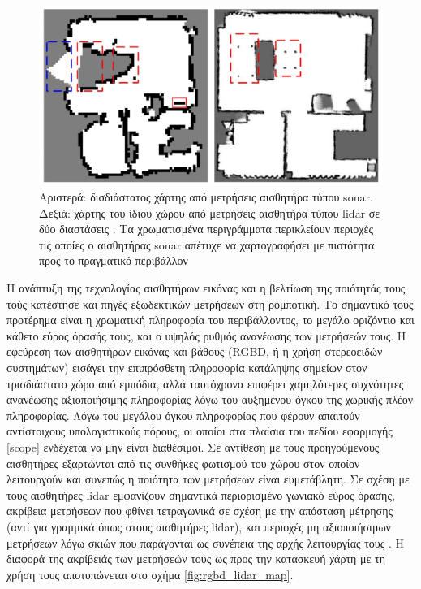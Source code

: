 \begin{figure}\centering
  \includegraphics[scale=0.5]{./figures/parts/01/chapters/01/sections/01/sonar_lidar_map.png}
  \caption{\small Αριστερά: δισδιάστατος χάρτης από μετρήσεις αισθητήρα τύπου
           sonar. Δεξιά: χάρτης του ίδιου χώρου από μετρήσεις αισθητήρα τύπου
           lidar σε δύο διαστάσεις \cite{Qi2020}. Τα χρωματισμένα περιγράμματα
           περικλείουν περιοχές τις οποίες ο αισθητήρας sonar απέτυχε να
           χαρτογραφήσει με πιστότητα προς το πραγματικό περιβάλλον}
  \label{fig:sonar_lidar_map}
\end{figure}

Η ανάπτυξη της τεχνολογίας αισθητήρων εικόνας και η βελτίωση της ποιότητάς τους
τούς κατέστησε και πηγές εξωδεκτικών μετρήσεων στη ρομποτική. Το σημαντικό τους
προτέρημα είναι η χρωματική πληροφορία του περιβάλλοντος, το μεγάλο οριζόντιο
και κάθετο εύρος όρασής τους, και ο υψηλός ρυθμός ανανέωσης των μετρήσεών τους.
Η εφεύρεση των αισθητήρων εικόνας και βάθους (RGBD, ή η χρήση στερεοειδών
συστημάτων) εισάγει την επιπρόσθετη πληροφορία κατάληψης σημείων στον
τρισδιάστατο χώρο από εμπόδια, αλλά ταυτόχρονα επιφέρει χαμηλότερες συχνότητες
ανανέωσης αξιοποιήσιμης πληροφορίας λόγω του αυξημένου όγκου της χωρικής πλέον
πληροφορίας. Λόγω του μεγάλου όγκου πληροφορίας που φέρουν απαιτούν
αντίστοιχους υπολογιστικούς πόρους, οι οποίοι στα πλαίσια του πεδίου εφαρμογής
\ref{scope} ενδέχεται να μην είναι διαθέσιμοι. Σε αντίθεση με τους
προηγούμενους αισθητήρες εξαρτώνται από τις συνθήκες φωτισμού του χώρου στον
οποίον λειτουργούν και συνεπώς η ποιότητα των μετρήσεων είναι ευμετάβλητη. Σε
σχέση με τους αισθητήρες lidar εμφανίζουν σημαντικά περιορισμένο γωνιακό εύρος
όρασης, ακρίβεια μετρήσεων που φθίνει τετραγωνικά σε σχέση με την απόσταση
μέτρησης (αντί για γραμμικά όπως στους αισθητήρες lidar), και περιοχές μη
αξιοποιήσιμων μετρήσεων λόγω σκιών που παράγονται ως συνέπεια της αρχής
λειτουργίας τους \cite{Mallick2014}. Η διαφορά της ακρίβειάς των μετρήσεών τους
ως προς την κατασκευή χάρτη με τη χρήση τους αποτυπώνεται στο σχήμα
\ref{fig:rgbd_lidar_map}.

